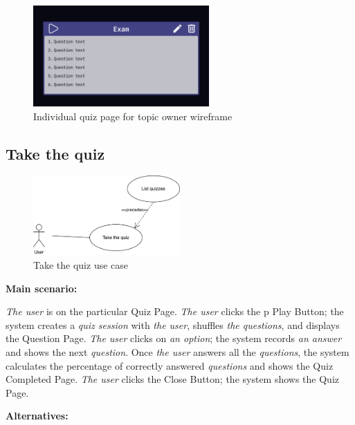 \documentclass[
    english, %
]{VUMIFPSkursinis}
\begin{document}
\pagebreak

\begin{figure}[ht]
    \centering
    \includegraphics[width=0.6\textwidth]{../lab3diags/Individual quiz.png}
    \caption{Individual quiz page for topic owner wireframe}
    \label{wireframe-quiz-page-topic-owner}
\end{figure}

\subsection{Take the quiz}

\begin{figure}[ht]
    \centering
    \includegraphics[width=0.5\textwidth]{../lab3diags/take-quiz.drawio.png}
    \caption{Take the quiz use case}
    \label{take-quiz}
\end{figure}

\noindent\textbf{\fontsize{13}{15}\selectfont Main scenario:}

\textit{The user} is on the particular Quiz Page. \textit{The user} clicks the p
Play Button; the system creates a \textit{quiz session} with \textit{the user}, shuffles \textit{the questions}, and displays the Question Page. \textit{The user} clicks on \textit{an option}; the system records \textit{an answer} and shows the next \textit{question}. Once \textit{the user} answers all the \textit{questions}, the system calculates the percentage of correctly answered \textit{questions} and shows the Quiz Completed Page. \textit{The user} clicks the Close Button; the system shows the Quiz Page.

\noindent\textbf{\fontsize{13}{15}\selectfont Alternatives:}
\end{document}
